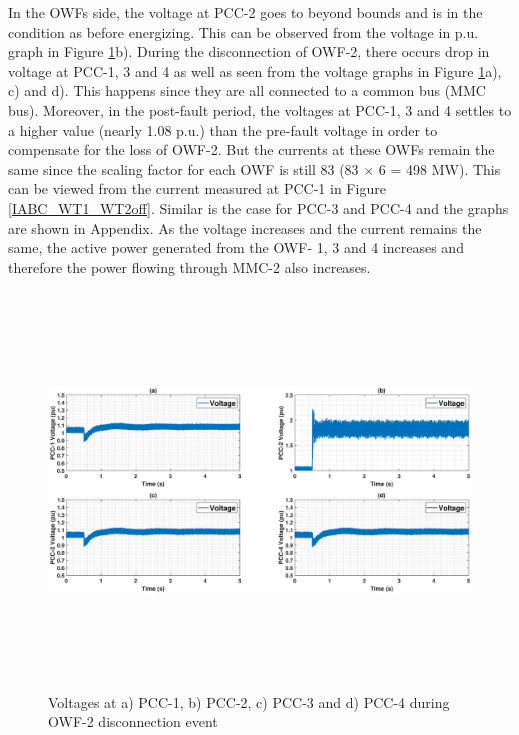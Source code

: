 In the \gls{OWF}s side, the voltage at \gls{PCC}-2 goes to beyond bounds and is in the condition as before energizing. This can be observed from the voltage in p.u. graph in Figure \ref{VACP_WT134_WT2off}b). During the disconnection of \gls{OWF}-2, there occurs drop in voltage at \gls{PCC}-1, 3 and 4 as well as seen from the voltage graphs in Figure \ref{VACP_WT134_WT2off}a), c) and d). This happens since they are all connected to a common bus (\gls{MMC} bus). Moreover, in the post-fault period, the voltages at \gls{PCC}-1, 3 and 4 settles to a higher value (nearly 1.08 p.u.) than the pre-fault voltage in order to compensate for the loss of \gls{OWF}-2. But the currents at these \gls{OWF}s remain the same since the scaling factor for each \gls{OWF} is still 83 (83 $\times$ 6 = 498 MW). This can be viewed from the current measured at \gls{PCC}-1 in Figure \ref{IABC_WT1_WT2off}. Similar is the case for \gls{PCC}-3 and \gls{PCC}-4 and the graphs are shown in Appendix. As the voltage increases and the current remains the same, the active power generated from the \gls{OWF}- 1, 3 and 4 increases and therefore the power flowing through \gls{MMC}-2 also increases.

\begin{figure}[H]
\hspace*{-1.7cm}
    \includegraphics[height = 10.5cm,width = 20.5cm]{Diagrams/Chapter_5/VACP_WT1234_WT2off.eps}
    \caption{Voltages at a) PCC-1, b) PCC-2, c) PCC-3 and d) PCC-4 during OWF-2 disconnection event}
    \label{VACP_WT134_WT2off}
\end{figure}

